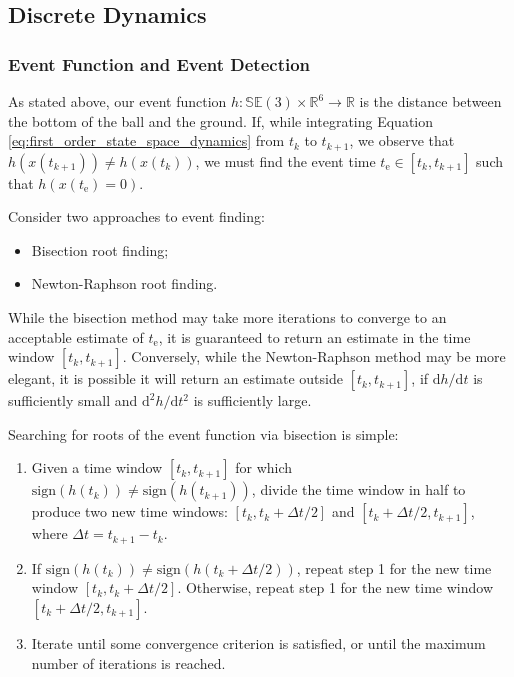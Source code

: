 \documentclass[]{article}
\theoremstyle{definition}
\theoremstyle{remark}
\begin{document}
\subsection{Discrete Dynamics}
\subsubsection{Event Function and Event Detection}
As stated above, our event function $h:\mathbb{SE}(3)\times\mathbb{R}^6 \to \mathbb{R}$ is the distance between the bottom of the ball and the ground.
If, while integrating Equation \eqref{eq:first_order_state_space_dynamics} from $t_k$ to $t_{k+1}$, we observe that $h(x(t_{k+1})) \neq h(x(t_k))$, we must find the event time $t_\mathrm{e}\in\left[t_k,t_{k+1}\right]$ such that $h(x(t_\mathrm{e}) = 0)$.

Consider two approaches to event finding:
\begin{itemize}
	\item Bisection root finding;
	\item Newton-Raphson root finding.
\end{itemize}
While the bisection method may take more iterations to converge to an acceptable estimate of $t_\mathrm{e}$, it is guaranteed to return an estimate in the time window $\left[t_k,t_{k+1}\right]$.
Conversely, while the Newton-Raphson method may be more elegant, it is possible it will return an estimate outside $\left[t_k,t_{k+1}\right]$, if $\mathrm{d}h/\mathrm{d}t$ is sufficiently small and $\mathrm{d}^2 h/\mathrm{d}t^2$ is sufficiently large.

Searching for roots of the event function via bisection is simple:
\begin{enumerate}
	\item Given a time window $\left[t_k,t_{k+1}\right]$ for which $\mathrm{sign}(h(t_k)) \neq \mathrm{sign}(h(t_{k+1}))$, divide the time window in half to produce two new time windows: $\left[t_k, t_k + \Delta t/2\right]$ and $\left[t_k + \Delta t/2, t_{k+1}\right]$, where $\Delta t = t_{k+1} - t_k$.
	\item If $\mathrm{sign}(h(t_k)) \neq \mathrm{sign}(h(t_k + \Delta t/2))$, repeat step 1 for the new time window $\left[t_k, t_k + \Delta t/2\right]$. Otherwise, repeat step 1 for the new time window $\left[t_k + \Delta t/2, t_{k+1}\right]$.
	\item Iterate until some convergence criterion is satisfied, or until the maximum number of iterations is reached.
\end{enumerate}
\end{document}
